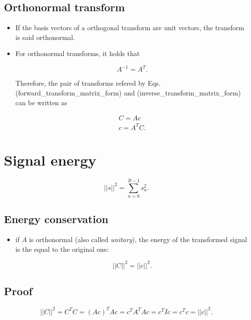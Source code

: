 \subsection{Orthonormal transform}
\begin{itemize}
\item
  If the basis vectors of a orthogonal transform are unit vectors, the
  transform is said orthonormal.
\item
  For orthonormal transforms, it holds that

  \begin{equation}
    A^{-1} = A^T.
  \end{equation}

  Therefore, the pair of transforms refered by Eqs.
  (forward\_transform\_matrix\_form) and
  (inverse\_transform\_matrix\_form) can be written as

  \begin{equation}
    \begin{array}{l}
      C=Ac \\
      c=A^TC.
    \end{array}
  \end{equation}
\end{itemize}

\section{Signal energy}
\begin{equation}
  ||s||^2 = \sum_{n=0}^{B-1}s_n^2.
\end{equation}

\subsection{Energy conservation}
\begin{itemize}
\item
  if \(A\) is orthonormal (also called \emph{unitary}), the energy of
  the transformed signal is the equal to the original one:

  \begin{equation}
     ||C||^2 = ||c||^2.
  \end{equation}
\end{itemize}

\subsection{Proof}
\begin{equation}
  ||C||^2 = C^TC = (Ac)^TAc = c^TA^TAc = c^TIc = c^Tc = ||c||^2.
\end{equation}

